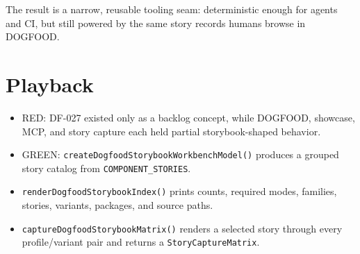 The result is a narrow, reusable tooling seam: deterministic enough for agents and CI, but still powered by the same story records humans browse in DOGFOOD.

\section{Playback}\label{record-088-playback}

\begin{itemize}
\tightlist
\item
  RED: DF-027 existed only as a backlog concept, while DOGFOOD, showcase, MCP, and story capture each held partial storybook-shaped behavior.
\item
  GREEN: \texttt{c\allowbreak{}r\allowbreak{}e\allowbreak{}a\allowbreak{}t\allowbreak{}e\allowbreak{}D\allowbreak{}o\allowbreak{}g\allowbreak{}f\allowbreak{}o\allowbreak{}o\allowbreak{}d\allowbreak{}S\allowbreak{}t\allowbreak{}o\allowbreak{}r\allowbreak{}y\allowbreak{}b\allowbreak{}o\allowbreak{}o\allowbreak{}k\allowbreak{}W\allowbreak{}o\allowbreak{}r\allowbreak{}k\allowbreak{}b\allowbreak{}e\allowbreak{}n\allowbreak{}c\allowbreak{}h\allowbreak{}M\allowbreak{}o\allowbreak{}d\allowbreak{}e\allowbreak{}l\allowbreak{}(\allowbreak{})} produces a grouped story catalog from \texttt{C\allowbreak{}O\allowbreak{}M\allowbreak{}P\allowbreak{}O\allowbreak{}N\allowbreak{}E\allowbreak{}N\allowbreak{}T\allowbreak{}\_\allowbreak{}S\allowbreak{}T\allowbreak{}O\allowbreak{}R\allowbreak{}I\allowbreak{}E\allowbreak{}S}.
\item
  \texttt{r\allowbreak{}e\allowbreak{}n\allowbreak{}d\allowbreak{}e\allowbreak{}r\allowbreak{}D\allowbreak{}o\allowbreak{}g\allowbreak{}f\allowbreak{}o\allowbreak{}o\allowbreak{}d\allowbreak{}S\allowbreak{}t\allowbreak{}o\allowbreak{}r\allowbreak{}y\allowbreak{}b\allowbreak{}o\allowbreak{}o\allowbreak{}k\allowbreak{}I\allowbreak{}n\allowbreak{}d\allowbreak{}e\allowbreak{}x\allowbreak{}(\allowbreak{})} prints counts, required modes, families, stories, variants, packages, and source paths.
\item
  \texttt{c\allowbreak{}a\allowbreak{}p\allowbreak{}t\allowbreak{}u\allowbreak{}r\allowbreak{}e\allowbreak{}D\allowbreak{}o\allowbreak{}g\allowbreak{}f\allowbreak{}o\allowbreak{}o\allowbreak{}d\allowbreak{}S\allowbreak{}t\allowbreak{}o\allowbreak{}r\allowbreak{}y\allowbreak{}b\allowbreak{}o\allowbreak{}o\allowbreak{}k\allowbreak{}M\allowbreak{}a\allowbreak{}t\allowbreak{}r\allowbreak{}i\allowbreak{}x\allowbreak{}(\allowbreak{})} renders a selected story through every profile/variant pair and returns a \texttt{S\allowbreak{}t\allowbreak{}o\allowbreak{}r\allowbreak{}y\allowbreak{}C\allowbreak{}a\allowbreak{}p\allowbreak{}t\allowbreak{}u\allowbreak{}r\allowbreak{}e\allowbreak{}M\allowbreak{}a\allowbreak{}t\allowbreak{}r\allowbreak{}i\allowbreak{}x}.

\end{itemize}
